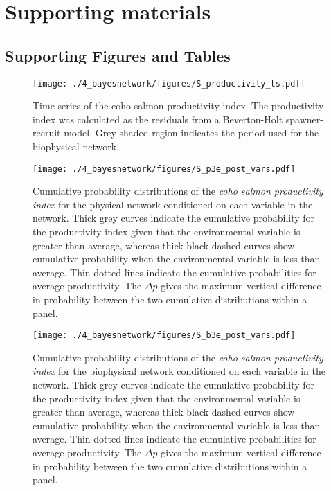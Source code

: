 \newpage
\section{Supporting materials}

\subsection{Supporting Figures and Tables}





\begin{figure}[htbp]
  \centering \texttt{[image: ./4\_bayesnetwork/figures/S\_productivity\_ts.pdf]}
  \caption[Time series of the coho salmon productivity index.]{Time series of
    the coho salmon productivity index. The productivity index was calculated as
    the residuals from a Beverton-Holt spawner-recruit model. Grey shaded region
    indicates the period used for the biophysical network.}
  \label{fig:bn:s1}
\end{figure}

\begin{figure}[htbp]
  \centering \texttt{[image: ./4\_bayesnetwork/figures/S\_p3e\_post\_vars.pdf]}
  \caption[Cumulative probability distributions of the coho salmon
    productivity index for the physical network conditioned on each variable in
    the network.]{Cumulative probability distributions of the \emph{coho salmon
    productivity index} for the physical network conditioned on each variable in
    the network. Thick grey curves indicate the cumulative probability for the
    productivity index given that the environmental variable is greater than
    average, whereas thick black dashed curves show cumulative probability when
    the environmental variable is less than average. Thin dotted lines indicate
    the cumulative probabilities for average productivity. The \(\Delta p\)
    gives the maximum vertical difference in probability between the two
    cumulative distributions within a panel.}
  \label{fig:bn:s2}
\end{figure}

\begin{figure}[htbp]
  \centering \texttt{[image: ./4\_bayesnetwork/figures/S\_b3e\_post\_vars.pdf]}
  \caption[Cumulative probability distributions of the coho salmon productivity
    index for the biophysical network conditioned on each variable in the
    network.]{Cumulative probability distributions of the \emph{coho salmon
    productivity index} for the biophysical network conditioned on each variable
    in the network. Thick grey curves indicate the cumulative probability for
    the productivity index given that the environmental variable is greater than
    average, whereas thick black dashed curves show cumulative probability when
    the environmental variable is less than average. Thin dotted lines indicate
    the cumulative probabilities for average productivity. The \(\Delta p\)
    gives the maximum vertical difference in probability between the two
    cumulative distributions within a panel.}
  \label{fig:bn:s3}
\end{figure}

